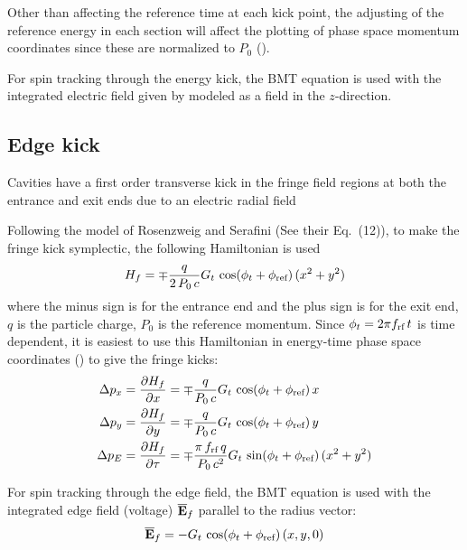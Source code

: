 Other than affecting the reference time at each kick point, the adjusting of the reference energy
in each section will affect the plotting of phase space momentum coordinates since these
are normalized to $P_0$ ().

For spin tracking through the energy kick, the BMT equation is used with the integrated electric field
given by  modeled as a field in the $z$-direction.

\subsection{Edge kick}

Cavities have a first order transverse kick in the fringe field regions at both the entrance and
exit ends due to an electric radial field 

Following the model of Rosenzweig and Serafini\cite{b:rosenzweig} (See their Eq.~(12)),
to make the fringe kick symplectic, the following Hamiltonian is used
\begin{equation}
  H_f = \mp \frac{q}{2 \, P_0 \, c} G_t \, \cos(\phi_t + \phi_{\text{ref}}) \, (x^2 + y^2)
\end{equation}
where the minus sign is for the entrance end and the plus sign is for the exit end, $q$ is the
particle charge, $P_0$ is the reference momentum. Since $\phi_t = 2 \pi f_{\text{rf}} \, t$ is time
dependent, it is easiest to use this Hamiltonian in energy-time phase space coordinates
() to give the fringe kicks:
\begin{align}
  \Delta p_x &= \frac{\partial H_f}{\partial x} 
              = \mp \frac{q}{P_0 \, c} G_t \, \cos(\phi_t + \phi_{\text{ref}}) \, x \nonumber \\
  \Delta p_y &= \frac{\partial H_f}{\partial y} 
              = \mp\frac{q}{P_0 \, c} G_t \, \cos(\phi_t + \phi_{\text{ref}}) \, y \\
  \Delta p_E &= \frac{\partial H_f}{\partial \tau} 
                 = \mp \frac{\pi \, f_{\text{rf}} \, q}{P_0 \, c^2} G_t \, \sin(\phi_t + \phi_{\text{ref}}) \, (x^2 + y^2)
      \nonumber
\end{align}

For spin tracking through the edge field, the BMT equation is used with the integrated edge field
(voltage) $\overline{{\bf E}}_f$ parallel to the radius vector:
\begin{equation}
  \overline{{\bf E}}_f = -G_t \, \cos(\phi_t + \phi_{\text{ref}}) \, (x, y, 0)
\end{equation}

